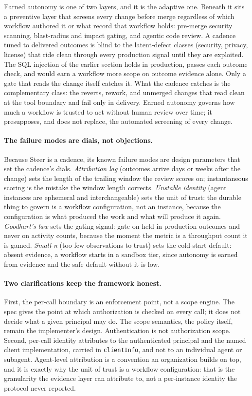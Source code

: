Earned autonomy is one of two layers, and it is the adaptive one. Beneath it
sits a preventive layer that screens every change before merge regardless of
which workflow authored it or what record that workflow holds: pre-merge
security scanning, blast-radius and impact gating, and agentic code review. A
cadence tuned to delivered outcomes is blind to the latent-defect classes
(security, privacy, license) that ride clean through every production signal
until they are exploited. The SQL injection of the earlier section holds in
production, passes each outcome check, and would earn a workflow more scope on
outcome evidence alone. Only a gate that reads the change itself catches it. What
the cadence catches is the complementary class: the reverts, rework, and unmerged
changes that read clean at the tool boundary and fail only in delivery.
Earned autonomy governs how much a workflow is trusted to act without human
review over time; it presupposes, and does not replace, the automated screening
of every change.

\paragraph{The failure modes are dials, not objections.} Because Steer is a
cadence, its known failure modes are design parameters that set the cadence's
dials. \emph{Attribution lag} (outcomes arrive days or weeks after the change)
sets the length of the trailing window the review scores on; instantaneous
scoring is the mistake the window length corrects. \emph{Unstable identity}
(agent instances are ephemeral and interchangeable) sets the unit of trust: the
durable thing to govern is a workflow configuration, not an instance, because the
configuration is what produced the work and what will produce it again.
\emph{Goodhart's law} sets the gating signal: gate on held-in-production outcomes
and never on activity counts, because the moment the metric is a throughput count
it is gamed. \emph{Small-n} (too few observations to trust) sets the
cold-start default: absent evidence, a workflow starts in a sandbox tier, since
autonomy is earned from evidence and the safe default without it is low.

\paragraph{Two clarifications keep the framework honest.} First, the per-call boundary is an enforcement point,
not a scope engine. The spec gives the point at which authorization is checked on
every call; it does not decide what a given principal may do. The scope
semantics, the policy itself, remain the implementer's design. Authentication is
not authorization scope. Second, per-call identity attributes to the
authenticated principal and the named client implementation, carried in
\texttt{clientInfo}, and not to an individual agent or subagent. Agent-level
attribution is a convention an organization builds on top, and it is exactly why
the unit of trust is a workflow configuration: that is the granularity the
evidence layer can attribute to, not a per-instance identity the protocol never
reported.

